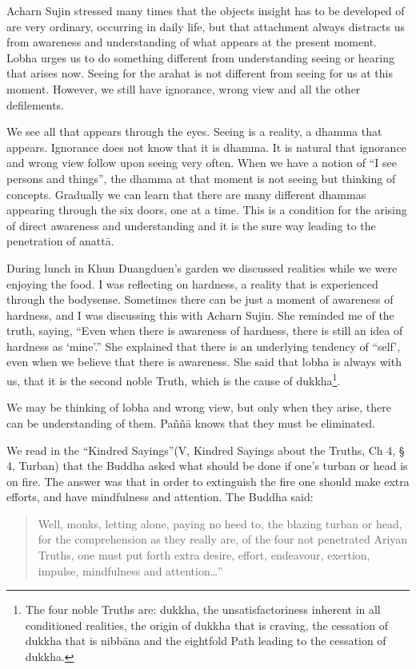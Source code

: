 Acharn Sujin stressed many times that the objects insight has to be developed of are very ordinary, occurring in daily life, but that attachment always distracts us from awareness and understanding of what appears at the present moment. Lobha urges us to do something different from understanding seeing or hearing that arises now. Seeing for the arahat is not different from seeing for us at this moment. However, we still have ignorance, wrong view and all the other defilements.

We see all that appears through the eyes. Seeing is a reality, a dhamma that appears. Ignorance does not know that it is dhamma. It is natural that ignorance and wrong view follow upon seeing very often. When we have a notion of ``I see persons and things'', the dhamma at that moment is not seeing but thinking of concepts. Gradually we can learn that there are many different dhammas appearing through the six doors, one at a time. This is a condition for the arising of direct awareness and understanding and it is the sure way leading to the penetration of anattā.

During lunch in Khun Duangduen’s garden we discussed realities while we were enjoying the food. I was reflecting on hardness, a reality that is experienced through the bodysense. Sometimes there can be just a moment of awareness of hardness, and I was discussing this with Acharn Sujin. She reminded me of the truth, saying, ``Even when there is awareness of hardness, there is still an idea of hardness as `mine'.'' She explained that there is an underlying tendency of ``self’, even when we believe that there is awareness. She said that lobha is always with us, that it is the second noble Truth, which is the cause of dukkha\footnote{The four noble Truths are: dukkha, the unsatisfactoriness inherent in all conditioned realities, the origin of dukkha that is craving, the cessation of dukkha that is nibbāna and the eightfold Path leading to the cessation of dukkha.}.

We may be thinking of lobha and wrong view, but only when they arise, there can be understanding of them. Paññā knows that they must be eliminated.

We read in the ``Kindred Sayings''(V, Kindred Sayings about the Truths, Ch 4, § 4, Turban) that the Buddha asked what should be done if one’s turban or head is on fire. The answer was that in order to extinguish the fire one should make extra efforts, and have mindfulness and attention. The Buddha said:

\begin{quote}

Well, monks, letting alone, paying no heed to, the blazing turban or head, for the comprehension as they really are, of the four not penetrated Ariyan Truths, one must put forth extra desire, effort, endeavour, exertion, impulse, mindfulness and attention\ldots''
\end{quote}

